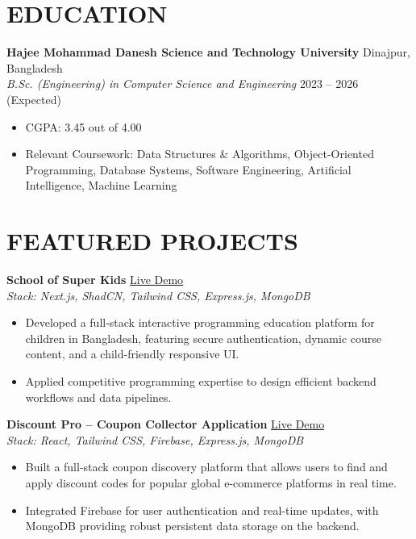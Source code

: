 \documentclass[10.5pt,a4paper]{article}
\begin{document}
\vspace{1pt}

\section*{EDUCATION}
\vspace{4pt}
\textbf{Hajee Mohammad Danesh Science and Technology University} \hfill Dinajpur, Bangladesh \\
\textit{B.Sc. (Engineering) in Computer Science and Engineering} \hfill 2023 -- 2026 (Expected)
\begin{itemize}
    \item CGPA: 3.45 out of 4.00
    \item Relevant Coursework: Data Structures & Algorithms, Object-Oriented Programming, Database Systems, Software
Engineering, Artificial Intelligence, Machine Learning %
\end{itemize}

\vspace{1pt}

\section*{FEATURED PROJECTS}
\vspace{4pt}

\noindent\textbf{School of Super Kids} \hfill \href{https://www.schoolofsuperkids.com/}{Live Demo} \\
\textit{Stack: Next.js, ShadCN, Tailwind CSS, Express.js, MongoDB}
\begin{itemize}
    \item Developed a full-stack interactive programming education platform for children in Bangladesh, featuring secure authentication, dynamic course content, and a child-friendly responsive UI.
    \item Applied competitive programming expertise to design efficient backend workflows and data pipelines.
\end{itemize}

\vspace{4pt}

\noindent\textbf{Discount Pro -- Coupon Collector Application} \hfill \href{https://discount-pro-200b8.web.app/}{Live Demo} \\
\textit{Stack: React, Tailwind CSS, Firebase, Express.js, MongoDB}
\begin{itemize}
    \item Built a full-stack coupon discovery platform that allows users to find and apply discount codes for popular global e-commerce platforms in real time.
    \item Integrated Firebase for user authentication and real-time updates, with MongoDB providing robust persistent data storage on the backend.
\end{itemize}
\end{document}
